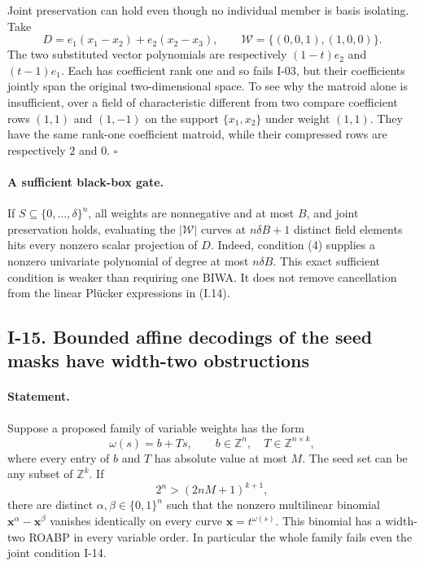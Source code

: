 Joint preservation can hold even though no individual member is
basis isolating.  Take
\[
 D=e_1(x_1-x_2)+e_2(x_2-x_3),\qquad
 \mathcal W=\{(0,0,1),(1,0,0)\}.
\]
The two substituted vector polynomials are respectively
$(1-t)e_2$ and $(t-1)e_1$.  Each has coefficient rank one and so
fails I-03, but their coefficients jointly span the original
two-dimensional space.  To see why the matroid alone is insufficient,
over a field of characteristic different from two compare coefficient
rows $(1,1)$ and $(1,-1)$ on the support $\{x_1,x_2\}$ under weight
$(1,1)$.  They have the same rank-one coefficient matroid, while
their compressed rows are respectively $2$ and $0$.
\hfill$\square$

\paragraph{A sufficient black-box gate.}
If $S\subseteq\{0,\ldots,\delta\}^n$, all weights are nonnegative
and at most $B$, and joint preservation holds, evaluating the
$|\mathcal W|$ curves at $n\delta B+1$ distinct field elements
hits every nonzero scalar projection of $D$.  Indeed, condition
(4) supplies a nonzero univariate polynomial of degree at most
$n\delta B$.  This exact sufficient condition is weaker than
requiring one BIWA.  It does not remove cancellation from the
linear Pl\"ucker expressions in (I.14).

\subsection{I-15. Bounded affine decodings of the seed masks have width-two obstructions}
\label{I-15}

\paragraph{Statement.}
Suppose a proposed family of variable weights has the form
\[
 \omega(s)=b+Ts,\qquad
 b\in\mathbb Z^n,\quad T\in\mathbb Z^{n\times k},
\]
where every entry of $b$ and $T$ has absolute value at most $M$.
The seed set can be any subset of $\mathbb Z^k$.  If
\[
 2^n>(2nM+1)^{k+1},
\tag{I.15}\label{eq:I-affine-mask-count}
\]
there are distinct $\alpha,\beta\in\{0,1\}^n$ such that the
nonzero multilinear binomial $\mathbf x^\alpha-\mathbf x^\beta$
vanishes identically on every curve $\mathbf x=t^{\omega(s)}$.
This binomial has a width-two ROABP in every variable order.
In particular the whole family fails even the joint condition I-14.

